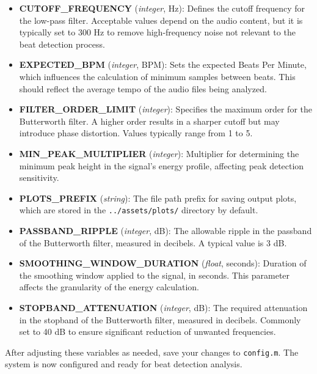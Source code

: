 \begin{itemize}
    \item \textbf{CUTOFF\_FREQUENCY} (\textit{integer}, Hz): Defines the cutoff frequency for the low-pass filter. Acceptable values depend on the audio content, but it is typically set to 300 Hz to remove high-frequency noise not relevant to the beat detection process.
    
    \item \textbf{EXPECTED\_BPM} (\textit{integer}, BPM): Sets the expected Beats Per Minute, which influences the calculation of minimum samples between beats. This should reflect the average tempo of the audio files being analyzed.
    
    \item \textbf{FILTER\_ORDER\_LIMIT} (\textit{integer}): Specifies the maximum order for the Butterworth filter. A higher order results in a sharper cutoff but may introduce phase distortion. Values typically range from 1 to 5.
    
    \item \textbf{MIN\_PEAK\_MULTIPLIER} (\textit{integer}): Multiplier for determining the minimum peak height in the signal's energy profile, affecting peak detection sensitivity.
    
    \item \textbf{PLOTS\_PREFIX} (\textit{string}): The file path prefix for saving output plots, which are stored in the \texttt{../assets/plots/} directory by default.
    
    \item \textbf{PASSBAND\_RIPPLE} (\textit{integer}, dB): The allowable ripple in the passband of the Butterworth filter, measured in decibels. A typical value is 3 dB.
    
    \item \textbf{SMOOTHING\_WINDOW\_DURATION} (\textit{float}, seconds): Duration of the smoothing window applied to the signal, in seconds. This parameter affects the granularity of the energy calculation.
    
    \item \textbf{STOPBAND\_ATTENUATION} (\textit{integer}, dB): The required attenuation in the stopband of the Butterworth filter, measured in decibels. Commonly set to 40 dB to ensure significant reduction of unwanted frequencies.
\end{itemize}

After adjusting these variables as needed, save your changes to \texttt{config.m}. The system is now configured and ready for beat detection analysis.

